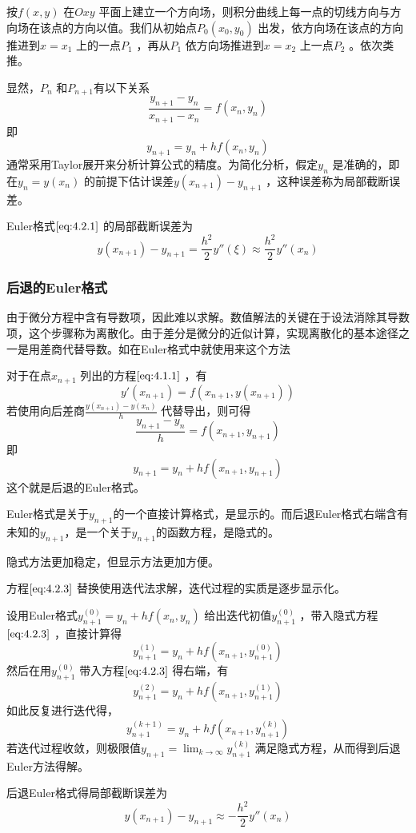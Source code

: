 \documentclass[a4paper]{article}
\begin{document}
按$f(x,y)$ 在$Oxy$ 平面上建立一个方向场，则积分曲线上每一点的切线方向与方向场在该点的方向以值。我们从初始点$P_0(x_0,y_0)$ 出发，依方向场在该点的方向推进到$x=x_1$ 上的一点$P_1$ ，再从$P_1$ 依方向场推进到$x=x_2$ 上一点$P_2$ 。依次类推。

显然，$P_n$ 和$P_{n+1}$有以下关系
\[
	\frac{y_{n+1} - y_{n}}{x_{n+1} - x_{n}} = f(x_{n}, y_{n})
\] 
即
\[
	y_{n+1} = y_{n} + h f(x_{n}, y_{n}) \tag{4.2.1} \label{eq:4.2.1} 
\] 
通常采用Taylor展开来分析计算公式的精度。为简化分析，假定$y_n$ 是准确的，即在$y_{n} = y(x_{n})$ 的前提下估计误差$y(x_{n+1}) - y_{n+1}$ ，这种误差称为局部截断误差。

Euler格式$\ref{eq:4.2.1}$ 的局部截断误差为
\[
	y(x_{n+1}) - y_{n+1} = \frac{h^2}{2} y''(\xi) \approx \frac{h^2}{2} y''(x_{n}) \tag{4.2.2} \label{eq:4.2.2}  
\] 

\subsubsection{后退的Euler格式}
由于微分方程中含有导数项，因此难以求解。数值解法的关键在于设法消除其导数项，这个步骤称为离散化。由于差分是微分的近似计算，实现离散化的基本途径之一是用差商代替导数。如在Euler格式中就使用来这个方法

对于在点$x_{n+1}$ 列出的方程$\ref{eq:4.1.1}$ ，有
\[
y'(x_{n+1}) =f(x_{n+1}, y(x_{n+1}))
\] 
若使用向后差商$\frac{y(x_{n+1}) - y(x_{n})}{h}$ 代替导出，则可得
\[
	\frac{y_{n+1} - y_{n}}{h} = f(x_{n+1}, y_{n+1})
\] 
即
\[
	y_{n+1} = y_{n} + h f(x_{n+1}, y_{n+1}) \tag{4.2.3} \label{eq:4.2.3} 
\] 
这个就是后退的Euler格式。

Euler格式是关于$y_{n+1}$的一个直接计算格式，是显示的。而后退Euler格式右端含有未知的$y_{n+1}$，是一个关于$y_{n+1}$的函数方程，是隐式的。

隐式方法更加稳定，但显示方法更加方便。

方程$\ref{eq:4.2.3}$ 替换使用迭代法求解，迭代过程的实质是逐步显示化。

设用Euler格式$y_{n+1}^{(0)} = y_{n} + h f(x_{n}, y_{n})$ 给出迭代初值$y_{n+1}^{(0)}$ ，带入隐式方程$\ref{eq:4.2.3}$ ，直接计算得
\[
y_{n+1}^{(1)} = y_{n} + h f(x_{n+1}, y_{n+1}^{(0)})
\] 
然后在用$y_{n+1}^{(0)}$ 带入方程$\ref{eq:4.2.3}$ 得右端，有
\[
y_{n+1}^{(2)} = y_{n} + h f(x_{n+1}, y_{n+1}^{(1)})
\] 
如此反复进行迭代得，
\[
y_{n+1}^{(k+1)} = y_{n} + h f(x_{n+1}, y_{n+1}^{(k)})
\] 
若迭代过程收敛，则极限值$y_{n+1} = \lim_{k \to \infty} y_{n+1}^{(k)}$ 满足隐式方程，从而得到后退Euler方法得解。

后退Euler格式得局部截断误差为
\[
y(x_{n+1}) - y_{n+1} \approx -\frac{h^2}{2} y''(x_{n}) \tag{4.2.4} \label{eq:4.2.4} 
\] 
\end{document}
